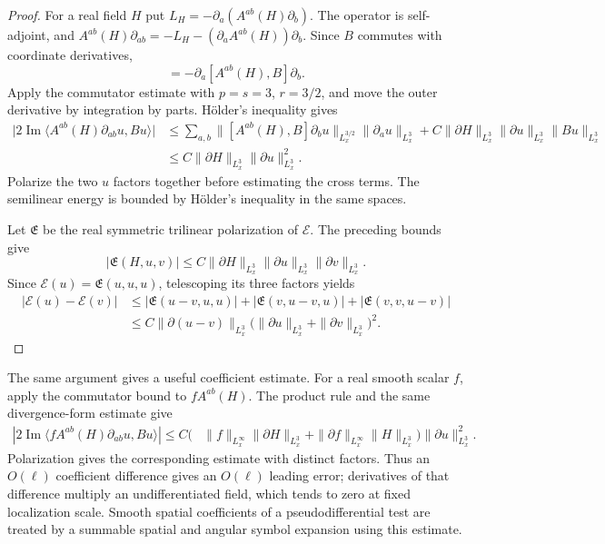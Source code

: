 \documentclass[11pt,a4paper]{article}
\numberwithin{equation}{section}
\newcommand{\ip}[2]{\langle #1,#2\rangle}
\renewcommand{\Im}{\operatorname{Im}}
\theoremstyle{definition}
\begin{document}
\begin{proof}
For a real field $H$ put
$L_H=-\partial_a(A^{ab}(H)\partial_b)$. The operator is self-adjoint, and
$A^{ab}(H)\partial_{ab}=-L_H-(\partial_aA^{ab}(H))\partial_b$.
Since $B$ commutes with coordinate derivatives,
\begin{equation*}
[L_H,B]=-\partial_a[A^{ab}(H),B]\partial_b.
\end{equation*}
Apply the commutator estimate with $p=s=3$, $r=3/2$,
and move the outer derivative by integration by parts. H\"older's inequality gives
\begin{equation*}
\begin{aligned}
\big|2\Im\ip{A^{ab}(H)\partial_{ab}u}{Bu}\big|
&\leq \sum_{a,b}\|[A^{ab}(H),B]\partial_bu\|_{L^{3/2}_x}
                    \|\partial_au\|_{L^3_x}
       +C\|\partial H\|_{L^3_x}\|\partial u\|_{L^3_x}\|Bu\|_{L^3_x}\\
&\leq C\|\partial H\|_{L^3_x}\|\partial u\|_{L^3_x}^2.
\end{aligned}
\end{equation*}
Polarize the two $u$ factors together before estimating the cross terms.
The semilinear energy is bounded by H\"older's inequality in the same spaces.

Let $\mathfrak E$ be the real symmetric trilinear polarization of $\mathcal E$.
The preceding bounds give
\begin{equation*}
|\mathfrak E(H,u,v)|
\leq C\|\partial H\|_{L^3_x}\|\partial u\|_{L^3_x}\|\partial v\|_{L^3_x}.
\end{equation*}
Since $\mathcal E(u)=\mathfrak E(u,u,u)$, telescoping its three factors yields
\begin{equation*}
\begin{aligned}
|\mathcal E(u)-\mathcal E(v)|
&\leq|\mathfrak E(u-v,u,u)|+|\mathfrak E(v,u-v,u)|
       +|\mathfrak E(v,v,u-v)|\\
&\leq C\|\partial(u-v)\|_{L^3_x}
       \bigg(\|\partial u\|_{L^3_x}+\|\partial v\|_{L^3_x}\bigg)^2.
\end{aligned}
\end{equation*}
\end{proof}


The same argument gives a useful coefficient estimate. For a real smooth
scalar $f$, apply the commutator bound to $fA^{ab}(H)$.
The product rule and the same divergence-form estimate give
\begin{equation*}
\begin{split}
\left|2\Im\langle f A^{ab}(H)\partial_{ab}u,Bu\rangle\right|
\leq C\bigl(&\|f\|_{L^{\infty}_x}\|\partial H\|_{L^3_x}
+\|\partial f\|_{L^{\infty}_x}\|H\|_{L^3_x}\bigr)\|\partial u\|_{L^3_x}^2.
\end{split}
\end{equation*}
Polarization gives the corresponding estimate with distinct factors.
Thus an $O(\ell)$ coefficient difference gives an $O(\ell)$ leading
error; derivatives of that difference multiply an undifferentiated
field, which tends to zero at fixed localization scale. Smooth spatial
coefficients of a pseudodifferential test are treated by a summable
spatial and angular symbol expansion using this estimate.
\end{document}
